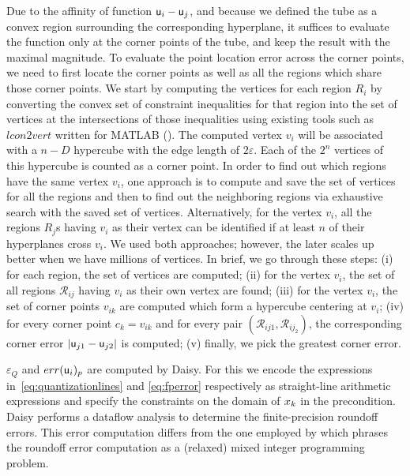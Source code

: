 Due to the affinity of function
$\mathsf u_{{i}}-\mathsf u_{{j}}$, and because we defined the tube as a convex region surrounding the corresponding hyperplane, it suffices
to evaluate the function only at the corner points of the tube, and keep the
result with the maximal magnitude. To evaluate the point location error across the corner points, we need to first locate the corner points as well as all the regions which share those corner points. We start by computing the vertices for each region $R_i$ by converting the convex set of constraint inequalities for that region into the set of vertices at the intersections of those inequalities using existing tools such as $\mathit{lcon2vert}$ written for MATLAB (\cite{????}). The computed vertex $v_i$ will be associated with a $n-D$ hypercube with the edge length of $2 \varepsilon$. Each of the $2^n$ vertices of this hypercube is counted as a corner point. In order to find out which regions have the same vertex $v_i$, one approach is to compute and save the set of vertices for all the regions and then to find out the neighboring regions via exhaustive search with the saved set of vertices. Alternatively, for the vertex $v_i$, all the regions $R_j$s having $v_i$ as their vertex can be identified if at least $n$ of their hyperplanes cross $v_i$. We used both approaches; however, the later scales up better when we have millions of vertices. In brief, we go through these steps: (i) for each region, the set of vertices are computed; (ii) for the vertex $v_i$, the set of all regions $\mathcal R_{ij}$ having $v_i$ as their own vertex are found; (iii) for the vertex $v_i$, the set of corner points $v_{ik}$ are computed which form a hypercube centering at $v_i$; (iv) for every corner point $c_k=v_{ik}$ and for every pair $(\mathcal R_{ij1},\mathcal R_{ij_2})$, the corresponding corner error $|\mathsf u_{{j1}}-\mathsf u_{{j2}}|$ is computed; (v) finally, we pick the greatest corner error.



$\varepsilon_Q$ and $err(\mathsf u_{{i}})_{p}$ are computed by Daisy. For this we encode
the expressions in~\autoref{eq:quantizationlines} and \autoref{eq:fperror}
respectively as straight-line arithmetic expressions and specify the constraints
on the domain of $x_{k}$ in the precondition.
Daisy performs a dataflow analysis to determine the finite-precision roundoff
errors. This error computation differs from the one employed by
\citet{imperialrmpc} which phrases the roundoff error computation as a (relaxed)
mixed integer programming problem.

